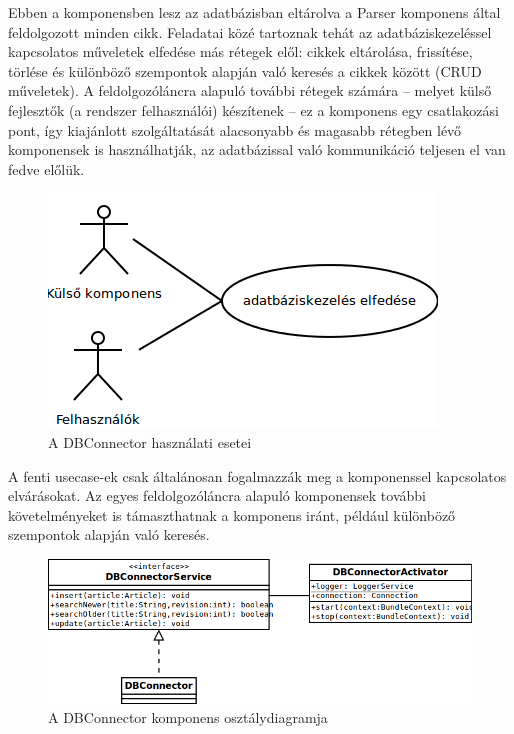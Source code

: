Ebben a komponensben lesz az adatbázisban eltárolva a Parser komponens által feldolgozott minden cikk. Feladatai közé tartoznak tehát az adatbáziskezeléssel kapcsolatos műveletek elfedése más rétegek elől: cikkek eltárolása, frissítése, törlése és különböző szempontok alapján való keresés a cikkek között (CRUD műveletek). A feldolgozóláncra alapuló további rétegek számára -- melyet külső fejlesztők (a rendszer felhasználói) készítenek -- ez a komponens egy csatlakozási pont, így kiajánlott szolgáltatását alacsonyabb és magasabb rétegben lévő komponensek is használhatják, az adatbázissal való kommunikáció teljesen el van fedve előlük.

\begin{figure}[htp]
\centering
\includegraphics[scale=0.5]{img/usecase_dbconnector}
\caption{A DBConnector használati esetei}
\label{fig:usecase_dbconnector}
\end{figure}

A fenti usecase-ek csak általánosan fogalmazzák meg a komponenssel kapcsolatos elvárásokat. Az egyes feldolgozóláncra alapuló komponensek további követelményeket is támaszthatnak a komponens iránt, például különböző szempontok alapján való keresés.

\begin{figure}[htp]
\centering
\includegraphics[scale=0.5]{img/class_dbconnector}
\caption{A DBConnector komponens osztálydiagramja}
\label{fig:}
\end{figure}

